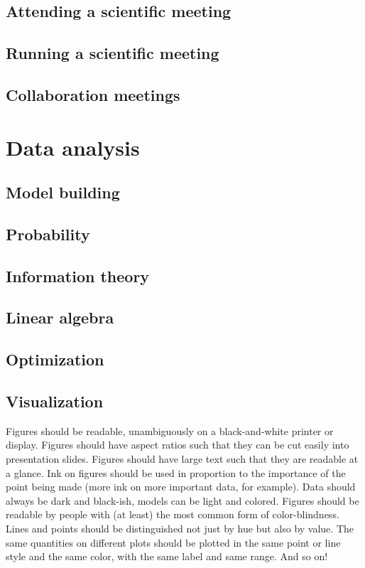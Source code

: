\documentclass[letterpaper]{book}
\begin{document}
\chapter{Attending a scientific meeting}

\chapter{Running a scientific meeting}

\chapter{Collaboration meetings}

\part{Data analysis}

\chapter{Model building}

\chapter{Probability}

\chapter{Information theory}

\chapter{Linear algebra}

\chapter{Optimization}

\chapter{Visualization}

Figures should be readable, unambiguously on a black-and-white printer or display.
Figures should have aspect ratios such that they can be cut easily into presentation slides.
Figures should have large text such that they are readable at a glance.
Ink on figures should be used in proportion to the importance of the point being made (more ink on more important data, for example).
Data should always be dark and black-ish, models can be light and colored.
Figures should be readable by people with (at least) the most common form of color-blindness.
Lines and points should be distinguished not just by hue but also by value.
The same quantities on different plots should be plotted in the same point or line style and the same color, with the same label and same range.
And so on!
\end{document}
